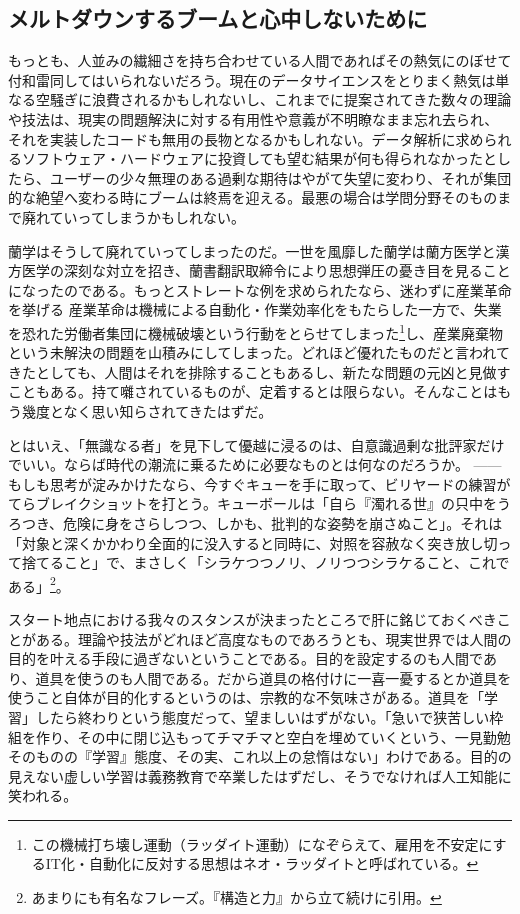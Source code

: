 \subsection{メルトダウンするブームと心中しないために}
もっとも、人並みの繊細さを持ち合わせている人間であればその熱気にのぼせて付和雷同してはいられないだろう。現在のデータサイエンスをとりまく熱気は単なる空騒ぎに浪費されるかもしれないし、これまでに提案されてきた数々の理論や技法は、現実の問題解決に対する有用性や意義が不明瞭なまま忘れ去られ、それを実装したコードも無用の長物となるかもしれない。データ解析に求められるソフトウェア・ハードウェアに投資しても望む結果が何も得られなかったとしたら、ユーザーの少々無理のある過剰な期待はやがて失望に変わり、それが集団的な絶望へ変わる時にブームは終焉を迎える。最悪の場合は学問分野そのものまで廃れていってしまうかもしれない。

蘭学はそうして廃れていってしまったのだ。一世を風靡した蘭学は蘭方医学と漢方医学の深刻な対立を招き、蘭書翻訳取締令により思想弾圧の憂き目を見ることになったのである。もっとストレートな例を求められたなら、迷わずに産業革命を挙げる
産業革命は機械による自動化・作業効率化をもたらした一方で、失業を恐れた労働者集団に機械破壊という行動をとらせてしまった\footnote{この機械打ち壊し運動（ラッダイト運動）になぞらえて、雇用を不安定にするIT化・自動化に反対する思想はネオ・ラッダイトと呼ばれている。}し、産業廃棄物という未解決の問題を山積みにしてしまった。どれほど優れたものだと言われてきたとしても、人間はそれを排除することもあるし、新たな問題の元凶と見做すこともある。持て囃されているものが、定着するとは限らない。そんなことはもう幾度となく思い知らされてきたはずだ。

とはいえ、「無識なる者」を見下して優越に浸るのは、自意識過剰な批評家だけでいい。ならば時代の潮流に乗るために必要なものとは何なのだろうか。
------もしも思考が淀みかけたなら、今すぐキューを手に取って、ビリヤードの練習がてらブレイクショットを打とう。キューボールは「自ら『濁れる世』の只中をうろつき、危険に身をさらしつつ、しかも、批判的な姿勢を崩さぬこと」。それは「対象と深くかかわり全面的に没入すると同時に、対照を容赦なく突き放し切って捨てること」で、まさしく「シラケつつノリ、ノリつつシラケること、これである」\footnote{あまりにも有名なフレーズ。『構造と力』から立て続けに引用。}。

スタート地点における我々のスタンスが決まったところで肝に銘じておくべきことがある。理論や技法がどれほど高度なものであろうとも、現実世界では人間の目的を叶える手段に過ぎないということである。目的を設定するのも人間であり、道具を使うのも人間である。だから道具の格付けに一喜一憂するとか道具を使うこと自体が目的化するというのは、宗教的な不気味さがある。道具を「学習」したら終わりという態度だって、望ましいはずがない。「急いで狭苦しい枠組を作り、その中に閉じ込もってチマチマと空白を埋めていくという、一見勤勉そのものの『学習』態度、その実、これ以上の怠惰はない」わけである。目的の見えない虚しい学習は義務教育で卒業したはずだし、そうでなければ人工知能に笑われる。

